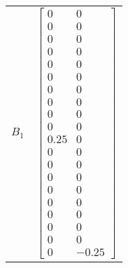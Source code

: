 \begin{tabular}{cl}
 $B_{1}$  & $\left[\begin{matrix}0 & 0\\0 & 0\\0 & 0\\0 & 0\\0 & 0\\0 & 0\\0 & 0\\0 & 0\\0 & 0\\0 & 0\\0.25 & 0\\0 & 0\\0 & 0\\0 & 0\\0 & 0\\0 & 0\\0 & 0\\0 & 0\\0 & 0\\0 & -0.25\end{matrix}\right]$                                                                                                                                                                                                                                                                                                                                                                                                                                                                                                                                                                                                                                                                                                                                                                                                                                                                                                                                                                                                                                                                                                                                                                                                                                                                                                                                                                                                                                                                                                                                                                                                                                                      \\

\end{tabular}
